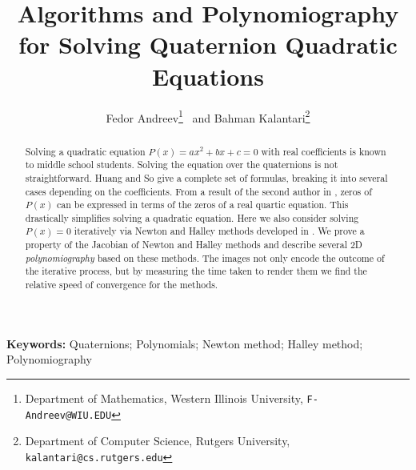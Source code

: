 \documentclass{article}
\theoremstyle{definition}
\begin{document}
\title{Algorithms and Polynomiography for Solving Quaternion Quadratic Equations}
\author{Fedor Andreev\thanks{Department of Mathematics,
        Western Illinois University, {\tt F-Andreev@WIU.EDU}}
        ~and Bahman Kalantari\thanks{Department of Computer Science,
        Rutgers University, {\tt kalantari@cs.rutgers.edu}}}
\date{}
\maketitle

\date{}
\maketitle






\begin{abstract}
Solving a quadratic equation $P(x)=ax^2+bx+c=0$  with real coefficients is known to middle school students.  Solving the equation over the quaternions is not straightforward. Huang and So \cite{Huang} give a complete set of formulas, breaking it into several cases depending on the coefficients.  From a result of the second author in \cite{kalQ}, zeros of $P(x)$ can be expressed in terms of the zeros of a real quartic equation. This drastically simplifies solving a quadratic equation. Here we also consider solving $P(x)=0$ iteratively via Newton and Halley methods developed in \cite{kalQ}. We prove a property of the Jacobian of Newton and Halley methods and describe several 2D {\it polynomiography} based on these methods. The images not only encode the outcome of the iterative process, but by measuring the time taken to render them we find the relative speed of convergence for the methods.

\end{abstract}

{\bf Keywords:}    Quaternions; Polynomials; Newton method; Halley method; Polynomiography
\end{document}
